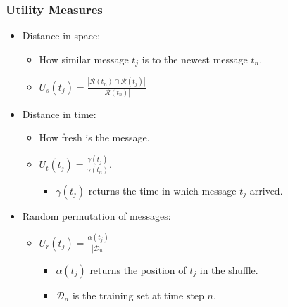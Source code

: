 \documentclass[14pt]{beamer}
\begin{document}
\begin{frame}\frametitle{Utility Measures}

\begin{itemize}
\item Distance in space:
\begin{itemize}
\item How similar message $t_j$ is to the newest message $t_n$.
\item $U_s(t_j)=\frac{|\mathcal{R}(t_n) \cap \mathcal{R}(t_j)|}{|\mathcal{R}(t_n)|}$
\end{itemize}
\item Distance in time:
\begin{itemize}
\item How fresh is the message.
\item $U_t(t_j)=\frac{\gamma(t_j)}{\gamma(t_n)}$.
\begin{itemize}
\item $\gamma(t_j)$ returns the time in which message $t_j$ arrived.
\end{itemize}
\end{itemize}
\item Random permutation of messages:
\begin{itemize}
\item $U_r(t_j)=\frac{\alpha(t_j)}{|\mathcal{D}_n|}$
\begin{itemize}
\item $\alpha(t_j)$ returns the position of $t_j$ in the shuffle.
\item $\mathcal{D}_n$ is the training set at time step $n$.
\end{itemize}
\end{itemize}
\end{itemize}

\end{frame}
\end{document}
